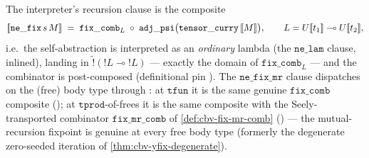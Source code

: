 \begin{definition}[The $\mathtt{ne\_fix}$ clause:
$\sem{\mathtt{fix}\,s.\,M} = \mathtt{fix\_comb} \circ
\sem{\lambda s.\,M}$]\label{def:cbv-fix-clause}
\rocqok
{}\rocqok
{}\rocqok
{}\rocqok
{}\rocqok
{}
The interpreter's recursion clause is the composite
\[
  \sem{\mathtt{ne\_fix}\,s\,M}
  \;=\;
  \mathtt{fix\_comb}_{L}
    \;\circ\;
  \mathtt{adj\_psi}\bigl(\mathtt{tensor\_curry}\,\sem{M}\bigr),
  \qquad
  L = U\sem{t_1} \multimap U\sem{t_2},
\]
i.e.\ the self-abstraction is interpreted as an \emph{ordinary} lambda
(the $\mathtt{ne\_lam}$ clause, inlined), landing in
$\widetilde{\mathord{!}}(\mathord{!}L \multimap \mathord{!}L)$ ---
exactly the domain of $\mathtt{fix\_comb}_L$ --- and the combinator is
post-composed (definitional pin
). The
$\mathtt{ne\_fix\_mr}$ clause dispatches on the (free) body type
through : at
$\mathtt{tfun}$ it is the same genuine $\mathtt{fix\_comb}$ composite
(); at
$\mathtt{tprod}$-of-frees it is the same composite with the
Seely-transported combinator $\mathtt{fix\_mr\_comb}$ of
\autoref{def:cbv-fix-mr-comb}
() --- the
mutual-recursion fixpoint is genuine at every free body type
(formerly the degenerate zero-seeded iteration of
\autoref{thm:cbv-yfix-degenerate}).
\end{definition}

